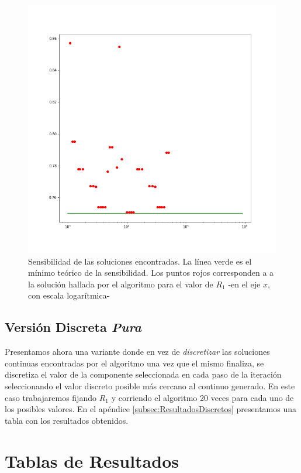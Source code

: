 \documentclass{llncs}
\begin{document}
	\begin{figure}[H]
		\includegraphics[width=\linewidth]{Discreto/sensibilidadVecinos.png}
		\caption{Sensibilidad de las soluciones encontradas. La línea verde es el mínimo teórico de la sensibilidad. Los puntos rojos
		corresponden a a la solución hallada por el algoritmo para el valor de $R_1$ -en el eje $x$, con escala logarítmica-}
		\label{fig:SensibilidadesDiscreto}
	\end{figure}

	\subsection{Versión Discreta \textit{Pura}}
	\label{subsec:VersionDiscretaPura}
	Presentamos ahora una variante donde en vez de \textit{discretizar} las soluciones continuas encontradas por el algoritmo
	una vez que el mismo finaliza, se discretiza el valor de la componente seleccionada en cada paso de la iteración seleccionando
	el valor discreto posible más cercano al continuo generado. En este caso trabajaremos fijando $R_1$ y corriendo el algoritmo 20 veces
	para cada uno de los posibles valores. En el apéndice \ref{subsec:ResultadosDiscretos} presentamos una tabla con los resultados obtenidos.
	

	\appendix
	\section{\textbf{Tablas de Resultados}}
\end{document}
